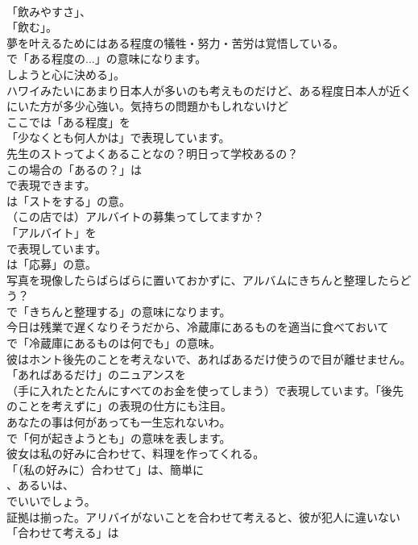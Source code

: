 \documentclass[8pt]{extreport}
\begin{document}
\begin{CJK}{UTF8}{min}
\\	「飲みやすさ」、
\\	「飲む」。	
\\	夢を叶えるためにはある程度の犠牲・努力・苦労は覚悟している。 
\\	で「ある程度の...」の意味になります。
\\	しようと心に決める」。	
\\	ハワイみたいにあまり日本人が多いのも考えものだけど、ある程度日本人が近くにいた方が多少心強い。気持ちの問題かもしれないけど 
\\	ここでは「ある程度」を
\\	「少なくとも何人かは」で表現しています。	
\\	先生のストってよくあることなの？明日って学校あるの？ 
\\	この場合の「あるの？」は 
\\	で表現できます。
\\	は「ストをする」の意。	
\\	（この店では）アルバイトの募集ってしてますか？ 
\\	「アルバイト」を 
\\	で表現しています。
\\	は「応募」の意。	
\\	写真を現像したらばらばらに置いておかずに、アルバムにきちんと整理したらどう？ 
\\	で「きちんと整理する」の意味になります。	
\\	今日は残業で遅くなりそうだから、冷蔵庫にあるものを適当に食べておいて 
\\	で「冷蔵庫にあるものは何でも」の意味。	
\\	彼はホント後先のことを考えないで、あればあるだけ使うので目が離せません。 
\\	「あればあるだけ」のニュアンスを 
\\	（手に入れたとたんにすべてのお金を使ってしまう）で表現しています。「後先のことを考えずに」の表現の仕方にも注目。	
\\	あなたの事は何があっても一生忘れないわ。 
\\	で「何が起きようとも」の意味を表します。	
\\	彼女は私の好みに合わせて、料理を作ってくれる。 
\\	「（私の好みに）合わせて」は、簡単に
\\	、あるいは、
\\	でいいでしょう。	
\\	証拠は揃った。アリバイがないことを合わせて考えると、彼が犯人に違いない 
\\	「合わせて考える」は

\end{CJK}
\end{document}
